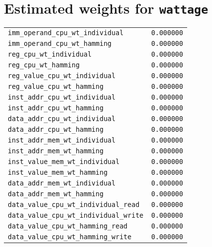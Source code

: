 
\chapter{Estimated weights for \texttt{wattage}} %

\label{AppendixA} %


\begin{tabular}{lc}
  \texttt{imm\_operand\_cpu\_wt\_individual} & \texttt{0.000000} \\
  \texttt{imm\_operand\_cpu\_wt\_hamming} & \texttt{0.000000} \\
  \texttt{reg\_cpu\_wt\_individual} & \texttt{0.000000} \\
  \texttt{reg\_cpu\_wt\_hamming} & \texttt{0.000000} \\
  \texttt{reg\_value\_cpu\_wt\_individual} & \texttt{0.000000} \\
  \texttt{reg\_value\_cpu\_wt\_hamming} & \texttt{0.000000} \\
  \texttt{inst\_addr\_cpu\_wt\_individual} & \texttt{0.000000} \\
  \texttt{inst\_addr\_cpu\_wt\_hamming} & \texttt{0.000000} \\
  \texttt{data\_addr\_cpu\_wt\_individual} & \texttt{0.000000} \\
  \texttt{data\_addr\_cpu\_wt\_hamming} & \texttt{0.000000} \\
  \texttt{inst\_addr\_mem\_wt\_individual} & \texttt{0.000000} \\
  \texttt{inst\_addr\_mem\_wt\_hamming} & \texttt{0.000000} \\
  \texttt{inst\_value\_mem\_wt\_individual} & \texttt{0.000000} \\
  \texttt{inst\_value\_mem\_wt\_hamming} & \texttt{0.000000} \\
  \texttt{data\_addr\_mem\_wt\_individual} & \texttt{0.000000} \\
  \texttt{data\_addr\_mem\_wt\_hamming} & \texttt{0.000000} \\
  \texttt{data\_value\_cpu\_wt\_individual\_read} & \texttt{0.000000} \\
  \texttt{data\_value\_cpu\_wt\_individual\_write} & \texttt{0.000000} \\
  \texttt{data\_value\_cpu\_wt\_hamming\_read} & \texttt{0.000000} \\
  \texttt{data\_value\_cpu\_wt\_hamming\_write} & \texttt{0.000000}
\end{tabular}

